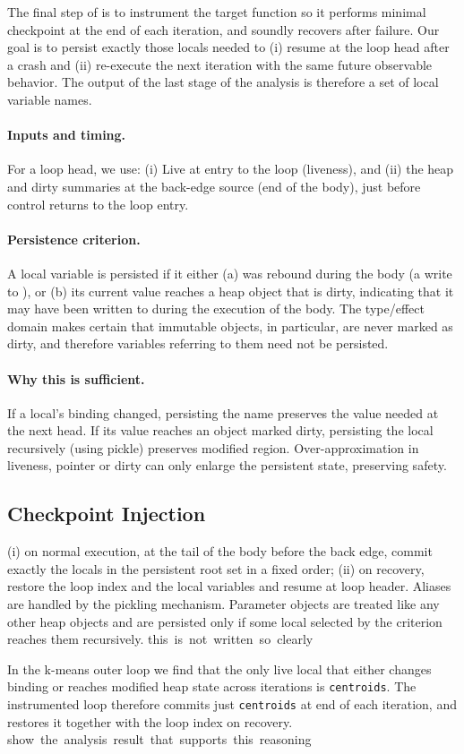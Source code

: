 The final step of \spyte is to instrument the target function so it performs minimal checkpoint at the end of each iteration, and soundly recovers after failure. Our goal is to persist exactly those locals needed to (i) resume at the loop head after a crash and (ii) re-execute the next iteration with the same future observable behavior. The output of the last stage of the analysis is therefore a set of local variable names.

\paragraph{Inputs and timing.}
For a loop head, we use:
(i) Live \tLOCALS at entry to the loop (liveness), and
(ii) the heap and dirty summaries at the back-edge source (end of the body), just before control returns to the loop entry.

\paragraph{Persistence criterion.}
A local variable is persisted if it either (a) was rebound during the body (a write to \tLOCALS), or (b) its current value reaches a heap object that is dirty, indicating that it may have been written to during the execution of the body.
The type/effect domain makes certain that immutable objects, in particular, are never marked as dirty, and therefore variables referring to them need not be persisted.

\paragraph{Why this is sufficient.}
If a local's binding changed, persisting the name preserves the value needed at the next head.
If its value reaches an object marked dirty, persisting the local recursively (using \eg pickle) preserves modified region.
Over-approximation in liveness, pointer or dirty can only enlarge the persistent state, preserving safety.

\subsection{Checkpoint Injection}

(i) on normal execution, at the tail of the body before the back edge, commit exactly the locals in the persistent root set in a fixed order;
(ii) on recovery, restore the loop index and the local variables and resume at loop header. Aliases are handled by the pickling mechanism.
Parameter objects are treated like any other heap objects and are persisted only if some local selected by the criterion reaches them recursively.
\si{this is not written so clearly}

\begin{example}
In the k-means outer loop we find that the only live local that either changes binding or reaches modified heap state across iterations is \texttt{centroids}. The instrumented loop therefore commits just \texttt{centroids} at end of each iteration, and restores it together with the loop index on recovery.
\si{show the analysis result that supports this reasoning}
\end{example}
